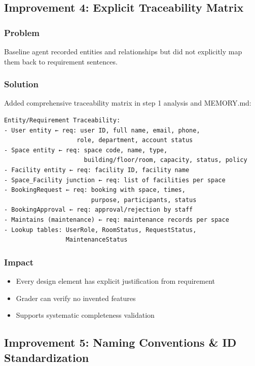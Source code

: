 \documentclass[12pt,a4paper]{article}
\begin{document}
\subsection{Improvement 4: Explicit Traceability Matrix}

\subsubsection{Problem}
Baseline agent recorded entities and relationships but did not explicitly map them back to requirement sentences.

\subsubsection{Solution}
Added comprehensive traceability matrix in step 1 analysis and MEMORY.md:

\begin{small}
\begin{verbatim}
Entity/Requirement Traceability:
- User entity ← req: user ID, full name, email, phone, 
                    role, department, account status
- Space entity ← req: space code, name, type, 
                      building/floor/room, capacity, status, policy
- Facility entity ← req: facility ID, facility name
- Space_Facility junction ← req: list of facilities per space
- BookingRequest ← req: booking with space, times, 
                        purpose, participants, status
- BookingApproval ← req: approval/rejection by staff
- Maintains (maintenance) ← req: maintenance records per space
- Lookup tables: UserRole, RoomStatus, RequestStatus, 
                 MaintenanceStatus
\end{verbatim}
\end{small}

\subsubsection{Impact}
\begin{itemize}
    \item Every design element has explicit justification from requirement
    \item Grader can verify no invented features
    \item Supports systematic completeness validation
\end{itemize}

\subsection{Improvement 5: Naming Conventions \& ID Standardization}
\end{document}
